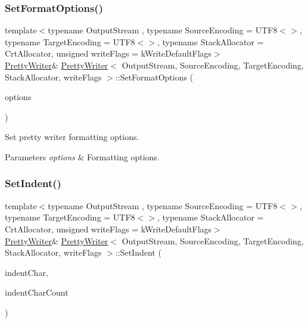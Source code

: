 \subsubsection{\texorpdfstring{Set\+Format\+Options()}{SetFormatOptions()}}
{\footnotesize\ttfamily template$<$typename Output\+Stream , typename Source\+Encoding  = U\+T\+F8$<$$>$, typename Target\+Encoding  = U\+T\+F8$<$$>$, typename Stack\+Allocator  = Crt\+Allocator, unsigned write\+Flags = k\+Write\+Default\+Flags$>$ \\
\hyperlink{classPrettyWriter}{Pretty\+Writer}\& \hyperlink{classPrettyWriter}{Pretty\+Writer}$<$ Output\+Stream, Source\+Encoding, Target\+Encoding, Stack\+Allocator, write\+Flags $>$\+::Set\+Format\+Options (\begin{DoxyParamCaption}\item[{\hyperlink{prettywriter_8h_a150fd6ef2dbf4025c33ece85451982d5}{Pretty\+Format\+Options}}]{options }\end{DoxyParamCaption})\hspace{0.3cm}{\ttfamily [inline]}}



Set pretty writer formatting options. 


\begin{DoxyParams}{Parameters}
{\em options} & Formatting options. \\
\hline
\end{DoxyParams}
\mbox{\label{classPrettyWriter_ad307b4c8d61af25042d0adcd0910c19a}} 
\subsubsection{\texorpdfstring{Set\+Indent()}{SetIndent()}}
{\footnotesize\ttfamily template$<$typename Output\+Stream , typename Source\+Encoding  = U\+T\+F8$<$$>$, typename Target\+Encoding  = U\+T\+F8$<$$>$, typename Stack\+Allocator  = Crt\+Allocator, unsigned write\+Flags = k\+Write\+Default\+Flags$>$ \\
\hyperlink{classPrettyWriter}{Pretty\+Writer}\& \hyperlink{classPrettyWriter}{Pretty\+Writer}$<$ Output\+Stream, Source\+Encoding, Target\+Encoding, Stack\+Allocator, write\+Flags $>$\+::Set\+Indent (\begin{DoxyParamCaption}\item[{\hyperlink{classPrettyWriter_ae35c89bda4c5d59d3ff6efcf2fea45a3}{Ch}}]{indent\+Char,  }\item[{unsigned}]{indent\+Char\+Count }\end{DoxyParamCaption})\hspace{0.3cm}{\ttfamily [inline]}}



